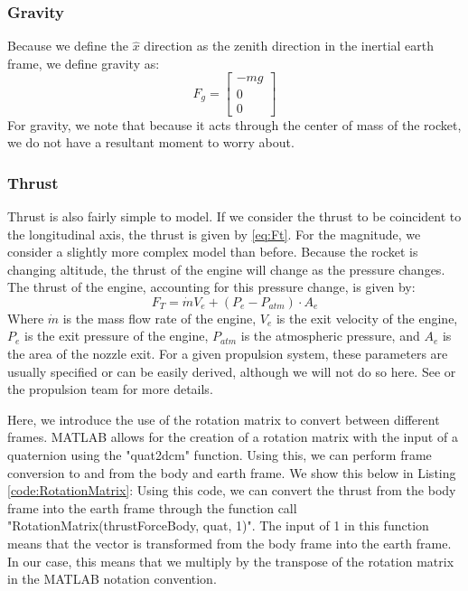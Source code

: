 \documentclass[12pt]{report}
\begin{document}
\subsubsection{Gravity}
Because we define the $\hat{x}$ direction as the zenith direction in the inertial earth frame, we define gravity as:
\begin{equation}
   F_g= \begin{bmatrix}
    -mg\\0\\0
\end{bmatrix}
\end{equation}
For gravity, we note that because it acts through the center of mass of the rocket, we do not have a resultant moment to worry about.
\subsubsection{Thrust}
Thrust is also fairly simple to model. If we consider the thrust to be coincident to the longitudinal axis, the thrust is given by \eqref{eq:Ft}. For the magnitude, we consider a slightly more complex model than before. Because the rocket is changing altitude, the thrust of the engine will change as the pressure changes. The thrust of the engine, accounting for this pressure change, is given by:
\begin{equation}
    F_T=\dot{m}V_e+\left(P_{e}-P_{atm}\right)\cdot A_e
\end{equation}
Where $\dot{m}$ is the mass flow rate of the engine, $V_e$ is the exit velocity of the engine, $P_e$ is the exit pressure of the engine, $P_{atm}$ is the atmospheric pressure, and $A_e$ is the area of the nozzle exit. For a given propulsion system, these parameters are usually specified or can be easily derived, although we will not do so here. See \cite{noauthor_chemical_nodate} or the propulsion team for more details.

Here, we introduce the use of the rotation matrix to convert between different frames. MATLAB allows for the creation of a rotation matrix with the input of a \gls{quaternion} using the "quat2dcm" function. Using this, we can perform frame conversion to and from the body and earth frame. We show this below in Listing \ref{code:RotationMatrix}:
\label{code:RotationMatrix}
Using this code, we can convert the thrust from the \gls{body frame} into the earth frame through the function call "RotationMatrix(thrustForceBody, quat, 1)". The input of 1 in this function means that the vector is transformed from the \gls{body frame} into the earth frame. In our case, this means that we multiply by the transpose of the rotation matrix in the MATLAB notation convention.
\end{document}
